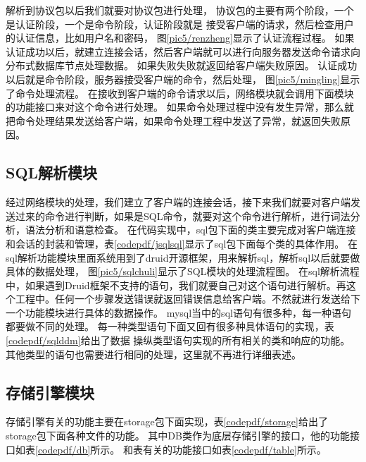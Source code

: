 解析到协议包以后我们就要对协议包进行处理，
协议包的主要有两个阶段，一个是认证阶段，一个是命令阶段，认证阶段就是
接受客户端的请求，然后检查用户的认证信息，比如用户名和密码，
图\ref{pic5/renzheng}显示了认证流程过程。
如果认证成功以后，就建立连接会话，然后客户端就可以进行向服务器发送命令请求向分布式数据库节点处理数据。
如果失败失败就返回给客户端失败原因。
认证成功以后就是命令阶段，服务器接受客户端的命令，然后处理，
图\ref{pic5/mingling}显示了命令处理流程。
在接收到客户端的命令请求以后，网络模块就会调用下面模块的功能接口来对这个命令进行处理。
如果命令处理过程中没有发生异常，那么就把命令处理结果发送给客户端，如果命令处理工程中发送了异常，就返回失败原因。
\subsection{SQL解析模块}
经过网络模块的处理，我们建立了客户端的连接会话，接下来我们就要对客户端发送过来的命令进行判断，如果是SQL命令，就要对这个命令进行解析，进行词法分析，语法分析和语意检查。
在代码实现中，sql包下面的类主要完成对客户端连接和会话的封装和管理，表\ref{codepdf/jsqlsql}显示了sql包下面每个类的具体作用。
在sql解析功能模块里面系统用到了druid开源框架，用来解析sql，解析sql以后就要做具体的数据处理，
图\ref{pic5/sqlchuli}显示了SQL模块的处理流程图。
在sql解析流程中，如果遇到Druid框架不支持的语句，我们就要自己对这个语句进行解析。再这个工程中。任何一个步骤发送错误就返回错误信息给客户端。不然就进行发送给下一个功能模块进行具体的数据操作。
mysql当中的sql语句有很多种，每一种语句都要做不同的处理。
每一种类型语句下面又回有很多种具体语句的实现，表\ref{codepdf/sqlddm}给出了数据
操纵类型语句实现的所有相关的类和响应的功能。
其他类型的语句也需要进行相同的处理，这里就不再进行详细表述。
\subsection{存储引擎模块}
存储引擎有关的功能主要在storage包下面实现，表\ref{codepdf/storage}给出了
storage包下面各种文件的功能。
其中DB类作为底层存储引擎的接口，他的功能接口如表\ref{codepdf/db}所示。
和表有关的功能接口如表\ref{codepdf/table}所示。

